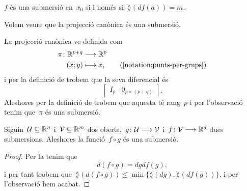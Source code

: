 \documentclass[../geometria-diferencial.tex]{subfiles}
\begin{document}
    \begin{observation}
        \label{obs:submersio-si-i-nomes-si-te-rang-mes-petit-o-igual}
        \(f\) és una submersió en~\(x_{0}\) si i només si~\(\rang(df(a))=m\).
    \end{observation}
    \begin{example}
        \label{ex:la-projeccio-canonica-es-una-submersio}
        Volem veure que la projecció canònica és una submersió.
    \end{example}
    \begin{solution}
        La projecció canònica ve definida com
        \begin{align*}
            \pi\colon\mathbb{R}^{p+q}&\longrightarrow\mathbb{R}^{p} \\
            (x;y)&\longmapsto x, \tag{\ref{notation:punts-per-grups}}
        \end{align*}
        i per la definició de  trobem que la seva diferencial és
        \[\left[\begin{array}{c|c}
        I_{p} & 0_{p\times(p+q)}
        \end{array}\right].\]
        Aleshores per la definició de  trobem que aquesta té rang~\(p\) i per l'observació  tenim que~\(\pi\) és una submersió.
    \end{solution}
    \begin{proposition}
        \label{prop:la-composicio-de-submersions-es-submersio}
        Siguin~\(\mathcal{U}\subseteq\mathbb{R}^{n}\) i~\(\mathcal{V}\subseteq\mathbb{R}^{m}\) dos oberts,~\(g\colon\mathcal{U}\longrightarrow\mathcal{V}\) i~\(f\colon\mathcal{V}\longrightarrow\mathbb{R}^{d}\) dues submersions.
        Aleshores la funció~\(f\circ g\) és una submersió.
    \end{proposition}
    \begin{proof}
        Per la  tenim que
        \[
            d(f\circ g)=dgdf(g),
        \]
        i per tant trobem que~\(\rang(d(f\circ g))\leq\min\{\rang(dg),\rang(df(g))\}\), i per l'observació  hem acabat.
    \end{proof}
\end{document}
